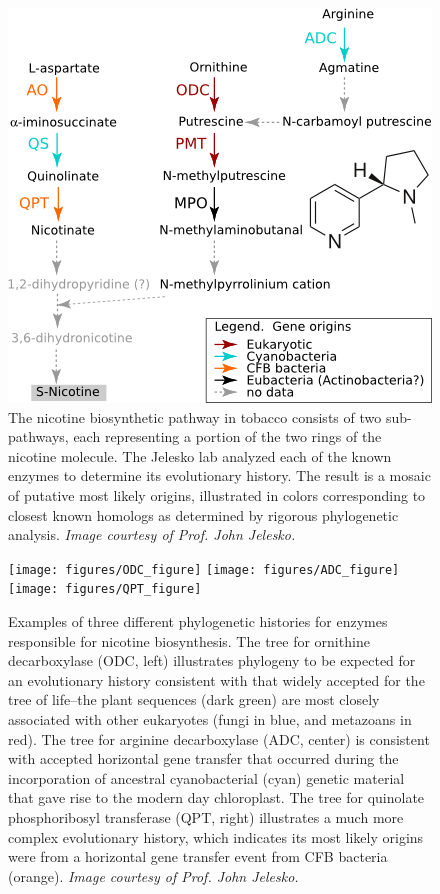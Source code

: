 \documentclass[11pt,letterpaper,twoside,english]{article}
\begin{document}
\begin{figure}[htbp]
    \begin{center}
        \includegraphics[width=.6\linewidth]{figures/pyridine_alkaloid_biosynthesis}
    \end{center}
    \caption{The nicotine biosynthetic pathway in tobacco consists of two
    sub-pathways, each representing a portion of the two rings of the nicotine
    molecule. The Jelesko lab analyzed each of the known enzymes to determine
    its evolutionary history. The result is a mosaic of putative most likely
    origins, illustrated in colors corresponding to closest known homologs as
    determined by rigorous phylogenetic analysis. \textit{Image courtesy of
    Prof. John Jelesko.}}
    \label{fig:nicotine}
\end{figure}

\begin{figure}[htbp]
    \begin{center}
        \texttt{[image: figures/ODC\_figure]}
        \texttt{[image: figures/ADC\_figure]}
        \texttt{[image: figures/QPT\_figure]}
    \end{center}
    \caption{Examples of three different phylogenetic histories for enzymes
    responsible for nicotine biosynthesis. The tree for ornithine
    decarboxylase (ODC, left) illustrates phylogeny to be expected for an
    evolutionary history consistent with that widely accepted for the tree of
    life--the plant sequences (dark green) are most closely associated with
    other eukaryotes (fungi in blue, and metazoans in red). The tree for
    arginine decarboxylase (ADC, center) is consistent with accepted
    horizontal gene transfer that occurred during the incorporation of
    ancestral cyanobacterial (cyan) genetic material that gave rise to the
    modern day chloroplast. The tree for quinolate phosphoribosyl transferase
    (QPT, right) illustrates a much more complex evolutionary history, which
    indicates its most likely origins were from a horizontal gene transfer
    event from CFB bacteria (orange). \textit{Image courtesy of Prof. John
    Jelesko.}}
    \label{fig:phylo_histories}
\end{figure}
\end{document}
